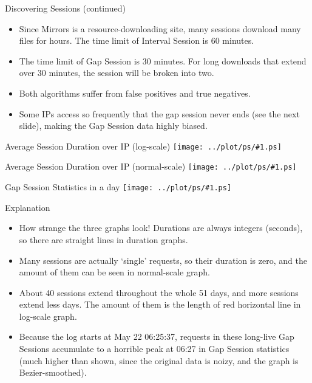 \documentclass{beamer}
\newcommand\graph[1]{{\texttt{[image: ../plot/ps/\#1.ps]}}}
\begin{document}
\begin{frame}{Discovering Sessions (continued)}
\begin{itemize}
  \item Since Mirrors is a resource-downloading site, many sessions download many files for hours. The time limit of Interval Session is 60 minutes.
  \item The time limit of Gap Session is 30 minutes. For long downloads that extend over 30 minutes, the session will be broken into two.
  \item Both algorithms suffer from false positives and true negatives.
  \item Some IPs access so frequently that the gap session never ends (see the next slide), making the Gap Session data highly biased.
\end{itemize}
\end{frame}

\begin{frame}{Average Session Duration over IP (log-scale)}
\graph{session-avg-duration-ip}
\end{frame}

\begin{frame}{Average Session Duration over IP (normal-scale)}
\graph{session-avg-duration-ip-nolog}
\end{frame}

\begin{frame}{Gap Session Statistics in a day}
\graph{session-daymin-gap}
\end{frame}

\begin{frame}{Explanation}
\begin{itemize}
  \item How strange the three graphs look! Durations are always integers (seconds), so there are straight lines in duration graphs.
  \item Many sessions are actually `single' requests, so their duration is zero, and the amount of them can be seen in normal-scale graph.
  \item About 40 sessions extend throughout the whole 51 days, and more sessions extend less days. The amount of them is the length of red horizontal line in log-scale graph.
  \item Because the log starts at May 22 06:25:37, requests in these long-live Gap Sessions accumulate to a horrible peak at 06:27 in Gap Session statistics (much higher than shown, since the original data is noizy, and the graph is Bezier-smoothed).
\end{itemize}
\end{frame}
\end{document}
